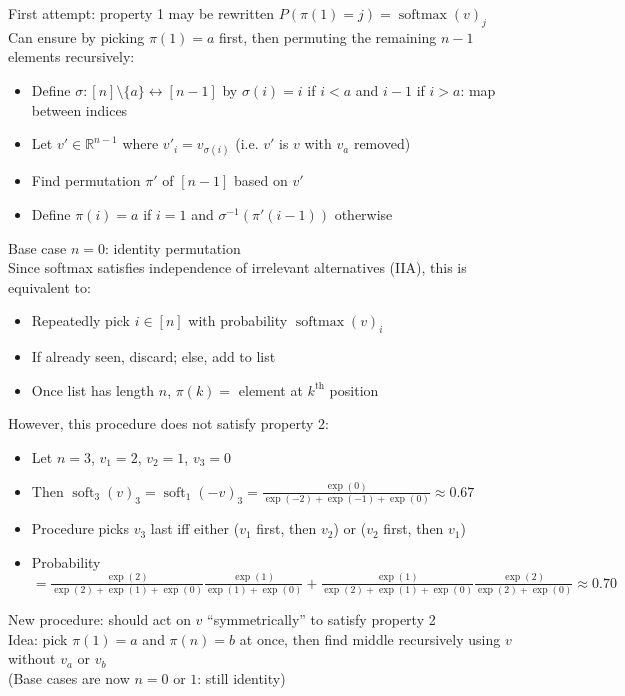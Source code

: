 \documentclass{article}
\newcommand{\R}{\mathbb{R}}
\DeclareMathOperator{\softmax}{softmax}
\DeclareMathOperator{\soft}{soft}
\begin{document}
First attempt: property 1 may be rewritten $P(\pi(1)=j) = \softmax(v)_j$ \\
Can ensure by picking $\pi(1) = a$ first,
then permuting the remaining $n-1$ elements recursively:
\begin{itemize}
\item
  Define $\sigma: [n] \setminus \{a\} \leftrightarrow [n-1]$
  by $\sigma(i) = i$ if $i < a$ and $i-1$ if $i > a$:
  map between indices
\item
  Let $v' \in \R^{n-1}$ where $v'_i = v_{\sigma(i)}$
  (i.e. $v'$ is $v$ with $v_a$ removed)
\item
  Find permutation $\pi'$ of $[n-1]$ based on $v'$
\item
  Define $\pi(i) = a$ if $i=1$ and $\sigma^{-1}(\pi'(i-1))$ otherwise
\end{itemize}
Base case $n=0$: identity permutation \\
Since softmax satisfies independence of irrelevant alternatives (IIA),
this is equivalent to:
\begin{itemize}
\item
  Repeatedly pick $i \in [n]$ with probability $\softmax(v)_i$
\item
  If already seen, discard; else, add to list
\item
  Once list has length $n$, $\pi(k) = $ element at $k^\text{th}$ position
\end{itemize}
However, this procedure does not satisfy property 2:
\begin{itemize}
\item
  Let $n=3$, $v_1=2$, $v_2=1$, $v_3=0$
\item
  Then $\soft_3(v)_3 = \soft_1(-v)_3 = \frac{\exp(0)}{\exp(-2)+\exp(-1)+\exp(0)} \approx 0.67$ \\
\item
  Procedure picks $v_3$ last iff either ($v_1$ first, then $v_2$) or ($v_2$ first, then $v_1$)
\item
  Probability $= \frac{\exp(2)}{\exp(2)+\exp(1)+\exp(0)}\frac{\exp(1)}{\exp(1)+\exp(0)}
  +\frac{\exp(1)}{\exp(2)+\exp(1)+\exp(0)}\frac{\exp(2)}{\exp(2)+\exp(0)}
  \approx 0.70$
\end{itemize}
New procedure: should act on $v$ ``symmetrically'' to satisfy property 2 \\
Idea: pick $\pi(1) = a$ and $\pi(n) = b$ at once,
then find middle recursively using $v$ without $v_a$ or $v_b$ \\
(Base cases are now $n=0$ or $1$: still identity) \\
\end{document}
